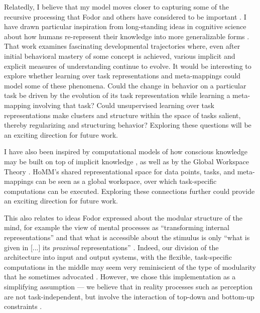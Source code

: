 Relatedly, I believe that my model moves closer to capturing some of the recursive processing that Fodor and others have considered to be important \citep[e.g.][]{Fodor2008lot2}. I have drawn particular inspiration from long-standing ideas in cognitive science about how humans re-represent their knowledge into more generalizable forms \citep{Karmiloff-Smith1986,Clark1993}. That work examines fascinating developmental trajectories where, even after initial behavioral mastery of some concept is achieved, various implicit and explicit measures of understanding continue to evolve. It would be interesting to explore whether learning over task representations and meta-mappings could model some of these phenomena. Could the change in behavior on a particular task be driven by the evolution of its task representation while learning a meta-mapping involving that task? Could unsupervised learning over task representations make clusters and structure within the space of tasks salient, thereby regularizing and structuring behavior? Exploring these questions will be an exciting direction for future work. \par 

I have also been inspired by computational models of how conscious knowledge may be built on top of implicit knowledge \citep{Cleeremans2014}, as well as by the Global Workspace Theory \citep{Baars2005}. HoMM's shared representational space for data points, tasks, and meta-mappings can be seen as a global workspace, over which task-specific computations can be executed. Exploring these connections further could provide an exciting direction for future work. \par

This also relates to ideas Fodor expressed about the modular structure of the mind, for example the view of mental processes as ``transforming internal representations'' and that what is accessible about the stimulus is only ``what is given in [...] its \emph{proximal} representations'' \citep[][pp. 200-201]{fodor1975language}. Indeed, our division of the architecture into input and output systems, with the flexible, task-specific computations in the middle may seem very reminiscient of the type of modularity that he sometimes advocated \citep{fodor1983modularity}. However, we chose this implementation as a simplifying assumption --- we believe that in reality processes such as perception are not task-independent, but involve the interaction of top-down and bottom-up constraints \citep{McClelland2014}. \par

